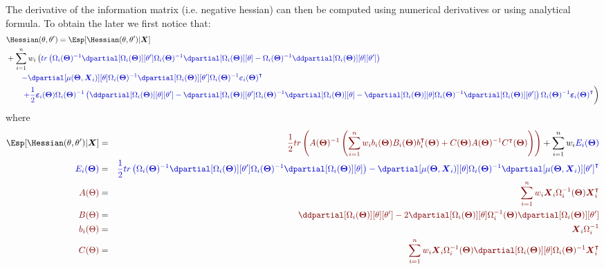 \documentclass[12pt]{article}
\newcommand{\darkblue}{blue!80!black}
\newcommand{\darkred}{red!50!black}
\newcommand\trans[1]{{#1}^\intercal}%
\newcommand{\param}{\Theta}
\newcommand{\Vparam}{\boldsymbol{\param}}
\newcommand{\VX}{\boldsymbol{X}}
\newcommand{\Vvarepsilon}{\boldsymbol{\varepsilon}}
\begin{document}
The derivative of the information matrix (i.e. negative hessian) can
then be computed using numerical derivatives or using analytical
formula. To obtain the later we first notice that:
\begin{align}
&\Hessian(\theta,\theta^{\prime}) = \Esp[\Hessian(\theta,\theta^{\prime})|\VX] \notag \\
& + \sum_{i=1}^n  w_i \left( \textcolor{\darkblue}{ tr\left(\Omega_i(\Vparam)^{-1} \dpartial[\Omega_i(\Vparam)][\theta^{\prime}] \Omega_i(\Vparam)^{-1} \dpartial[\Omega_i(\Vparam)][\theta] - \Omega_i(\Vparam)^{-1} \ddpartial[\Omega_i(\Vparam)][\theta][\theta^{\prime}] \right) } \right. \notag \\
& \qquad \textcolor{\darkblue}{ -  \dpartial[\mu(\Vparam,\VX_i)][\theta] \Omega_i(\Vparam)^{-1} \dpartial[\Omega_i(\Vparam)][\theta^{\prime}] \Omega_i(\Vparam)^{-1} \trans{\Vvarepsilon_i(\Vparam)}} \notag \\
& \qquad \left. \textcolor{\darkblue}{ + \frac{1}{2} \Vvarepsilon_i(\Vparam) \Omega_i(\Vparam)^{-1} \left(\ddpartial[\Omega_i(\Vparam)][\theta][\theta^{\prime}] - \dpartial[\Omega_i(\Vparam)][\theta^{\prime}] \Omega_i(\Vparam)^{-1} \dpartial[\Omega_i(\Vparam)][\theta] - \dpartial[\Omega_i(\Vparam)][\theta] \Omega_i(\Vparam)^{-1} \dpartial[\Omega_i(\Vparam)][\theta^{\prime}] \right) \Omega_i(\Vparam)^{-1} \trans{\Vvarepsilon_i(\Vparam)} } \right) \label{eq:diffInfo}
\end{align}
where
\begin{align*}
\Esp[\Hessian(\theta,\theta^{\prime})|\VX] &=& \textcolor{\darkred}{
\frac{1}{2} tr \left(A(\Vparam)^{-1} \left(\sum_{i=1}^n w_i b_i(\Vparam) B_i(\Vparam) \trans{b}_i(\Vparam) + C(\Vparam)A(\Vparam)^{-1} \trans{C}(\Vparam) \right)\right)
}  + \sum_{i=1}^n w_i \textcolor{\darkblue}{E_i(\Vparam)} \\
\textcolor{\darkblue}{E_i(\Vparam)} &=& \textcolor{\darkblue}{\frac{1}{2} tr\left(\Omega_i(\Vparam)^{-1} \dpartial[\Omega_i(\Vparam)][\theta^{\prime}] \Omega_i(\Vparam)^{-1} \dpartial[\Omega_i(\Vparam)][\theta]\right)
                                        - \dpartial[\mu(\Vparam,\VX_i)][\theta] \Omega_i(\Vparam)^{-1} \trans{\dpartial[\mu(\Vparam,\VX_i)][\theta^{\prime}]}} \\
\textcolor{\darkred}{A(\Theta)} &=& \textcolor{\darkred}{\sum_{i=1}^n w_i \VX_i \Omega_i^{-1}(\Vparam) \trans{\VX}_i }\\
\textcolor{\darkred}{B(\Theta)} &=& \textcolor{\darkred}{\ddpartial[\Omega_i(\Vparam)][\theta][\theta^{\prime}] - 2 \dpartial[\Omega_i(\Vparam)][\theta]  \Omega_i^{-1}(\Vparam) \dpartial[\Omega_i(\Vparam)][\theta^{\prime}] }\\
\textcolor{\darkred}{b_i(\Theta)} &=& \textcolor{\darkred}{\VX_i \Omega_i^{-1} }\\
\textcolor{\darkred}{C(\Theta)} &=& \textcolor{\darkred}{\sum_{i=1}^n w_i \VX_i \Omega_i^{-1}(\Vparam) \dpartial[\Omega_i(\Vparam)][\theta] \Omega_i(\Vparam)^{-1} \trans{\VX}_i }
\end{align*}
\end{document}
